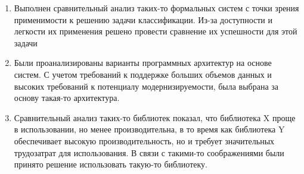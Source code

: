 \begin{enumerate}
	\item Выполнен сравнительный анализ таких-то формальных систем с точки зрения применимости к решению  задачи классификации. Из-за доступности и легкости их применения решено провести сравнение их успешности для этой задачи
	\item Были проанализированы варианты программных архитектур на основе систем. С учетом требований к поддержке больших объемов данных и высоких требований к потенциалу модернизируемости, была выбрана за основу такая-то архитектура.
	\item Сравнительный анализ таких-то библиотек показал, что библиотека X проще в использовании, но менее производительна, в то время как библиотека Y обеспечивает высокую производительность, но и требует значительных трудозатрат для использования. В связи с такими-то соображениями были принято решение использовать такую-то библиотеку.
\end{enumerate}

